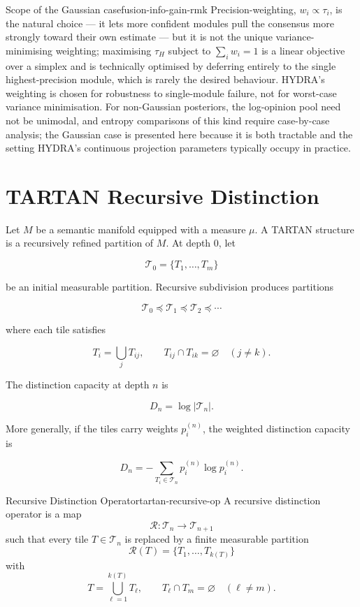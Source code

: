 \documentclass[12pt,twoside,openright]{book}
\begin{document}
\begin{remark}{Scope of the Gaussian case}{fusion-info-gain-rmk}
  Precision-weighting, $w_i \propto \tau_i$, is the natural
  choice — it lets more confident modules pull the consensus
  more strongly toward their own estimate — but it is not
  the unique variance-minimising weighting; maximising
  $\tau_H$ subject to $\sum_i w_i = 1$ is a linear objective
  over a simplex and is technically optimised by deferring
  entirely to the single highest-precision module, which is
  rarely the desired behaviour. HYDRA's weighting is chosen
  for robustness to single-module failure, not for
  worst-case variance minimisation. For non-Gaussian
  posteriors, the log-opinion pool need not be unimodal, and
  entropy comparisons of this kind require case-by-case
  analysis; the Gaussian case is presented here because it
  is both tractable and the setting HYDRA's continuous
  projection parameters typically occupy in practice.
\end{remark}

\section{TARTAN Recursive Distinction}

Let \(M\) be a semantic manifold equipped with a measure
\(\mu\). A TARTAN structure is a recursively refined
partition of \(M\). At depth \(0\), let

\[
\mathcal T_0=\{T_1,\ldots,T_m\}
\]

be an initial measurable partition. Recursive subdivision
produces partitions

\[
\mathcal T_0 \preceq \mathcal T_1 \preceq
\mathcal T_2 \preceq \cdots
\]

where each tile satisfies

\[
T_i=\bigcup_j T_{ij},
\qquad
T_{ij}\cap T_{ik}=\varnothing
\quad(j\neq k).
\]

The distinction capacity at depth \(n\) is

\[
D_n=\log |\mathcal T_n|.
\]

More generally, if the tiles carry weights \(p_i^{(n)}\),
the weighted distinction capacity is

\[
D_n
=
-\sum_{T_i\in\mathcal T_n}
p_i^{(n)}
\log p_i^{(n)}.
\]

\begin{definition}{Recursive Distinction Operator}{tartan-recursive-op}
  A recursive distinction operator is a map
  \[
    \mathcal R:\mathcal T_n\to \mathcal T_{n+1}
  \]
  such that every tile \(T\in\mathcal T_n\) is replaced by
  a finite measurable partition
  \[
    \mathcal R(T)=\{T_1,\ldots,T_{k(T)}\}
  \]
  with
  \[
    T=\bigcup_{\ell=1}^{k(T)}T_\ell,
    \qquad
    T_\ell\cap T_m=\varnothing
    \quad(\ell\neq m).
  \]
\end{definition}
\end{document}
